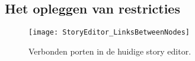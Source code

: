     







\subsection{Het opleggen van restricties}

\begin{wrapfigure}{r}{0.2\textwidth}
    \centering    
    \texttt{[image: StoryEditor\_LinksBetweenNodes]}
    \caption{Verbonden porten in de huidige story editor.}
    \label{fig:linksinstoryeditor}
\end{wrapfigure}

